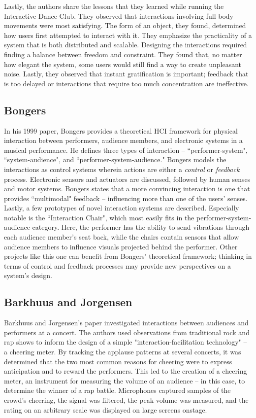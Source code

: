 Lastly, the authors share the lessons that they learned while running the Interactive Dance Club. They observed that interactions involving full-body movements were most satisfying. The form of an object, they found, determined how users first attempted to interact with it. They emphasize the practicality of a system that is both distributed and scalable. Designing the interactions required finding a balance between freedom and constraint. They found that, no matter how elegant the system, some users would still find a way to create unpleasant noise. Lastly, they observed that instant gratification is important; feedback that is too delayed or interactions that require too much concentration are ineffective.

\subsection{Bongers}

In his 1999 paper, Bongers provides a theoretical HCI framework for physical interaction between performers, audience members, and electronic systems in a musical performance. He defines three types of interaction -- ``performer-system", ``system-audience", and ``performer-system-audience." Bongers models the interactions as control systems wherein actions are either a \emph{control} or \emph{feedback} process. Electronic sensors and actuators are discussed, followed by human senses and motor systems. Bongers states that a more convincing interaction is one that provides ``multimodal" feedback -- influencing more than one of the users' senses. Lastly, a few prototypes of novel interaction systems are described. Especially notable is the ``Interaction Chair", which most easily fits in the performer-system-audience category. Here, the performer has the ability to send vibrations through each audience member's seat back, while the chairs contain sensors that allow audience members to influence visuals projected behind the performer. Other projects like this one can benefit from Bongers' theoretical framework; thinking in terms of control and feedback processes may provide new perspectives on a  system's design.

\subsection{Barkhuus and Jorgensen}

Barkhuus and Jorgensen's paper investigated interactions between audiences and performers at a concert. The authors used observations from traditional rock and rap shows to inform the design of a simple "interaction-facilitation technology" -- a cheering meter. By tracking the applause patterns at several concerts, it was determined that the two most common reasons for cheering were to express anticipation and to reward the performers. This led to the creation of a cheering meter, an instrument for measuring the volume of an audience -- in this case, to determine the winner of a rap battle. Microphones captured samples of the crowd's cheering, the signal was filtered, the peak volume was measured, and the rating on an arbitrary scale was displayed on large screens onstage.

